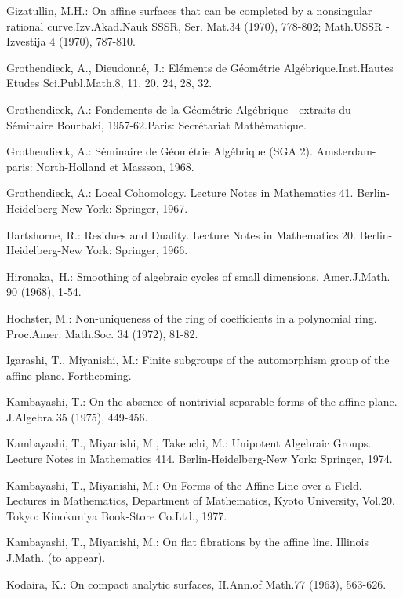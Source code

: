 \begin{thebibliography}{99}
 Gizatullin, M.H.: On affine surfaces that can be completed by a
  nonsingular rational curve.\@ Izv.\@ Akad.\@ Nauk SSSR, Ser.\@
  Mat.\@ 34 (1970), 778-802; Math.\@ USSR - Izvestija 4 (1970),
  787-810.

 Grothendieck, A., Dieudonn\'e, J.: El\'ements de G\'eom\'etrie
  Alg\'ebrique.\@ Inst.\@ Hautes Etudes Sci.\@ Publ.\@ Math.\@ 8, 11,
  20, 24, 28, 32.

 Grothendieck, A.: Fondements de la G\'eom\'etrie Alg\'ebrique -
  extraits du S\'eminaire Bourbaki, 1957-62.\@ Paris: Secr\'etariat
  Math\'ematique. 

 Grothendieck, A.: S\'eminaire de G\'eom\'etrie Alg\'ebrique (SGA
  2). Amsterdam-paris: North-Holland et Massson, 1968.

 Grothendieck, A.: Local Cohomology. Lecture Notes in Mathematics
  41. Berlin-Heidelberg-New York: Springer, 1967.

 Hartshorne, R.: Residues and Duality. Lecture Notes in
  Mathematics 20. Berlin-Heidelberg-New York: Springer, 1966.

 Hironaka,\pageoriginale\ H.: Smoothing of algebraic cycles of
  small dimensions. Amer.\@ J.\@ Math. 90 (1968), 1-54.

 Hochster, M.: Non-uniqueness of the ring of coefficients in a
  polynomial ring. Proc.\@ Amer. Math.\@ Soc. 34 (1972), 81-82.

 Igarashi, T., Miyanishi, M.: Finite subgroups of the
  automorphism group of the affine plane. Forthcoming.

 Kambayashi, T.: On the absence of nontrivial separable forms of
  the affine plane. J.\@ Algebra 35 (1975), 449-456.

 Kambayashi, T., Miyanishi, M., Takeuchi, M.: Unipotent Algebraic
  Groups. Lecture Notes in Mathematics 414. Berlin-Heidelberg-New
  York: Springer, 1974.

 Kambayashi, T., Miyanishi, M.: On Forms of the Affine Line over
  a Field. Lectures in Mathematics, Department of Mathematics, Kyoto
  University, Vol.\@ 20. Tokyo: Kinokuniya Book-Store Co.\@ Ltd.,
  1977.

 Kambayashi, T., Miyanishi, M.: On flat fibrations by the affine
  line. Illinois J.\@ Math. (to appear).

 Kodaira, K.: On compact analytic surfaces, II.\@ Ann.\@ of
  Math.\@ 77 (1963), 563-626.


\end{thebibliography}
